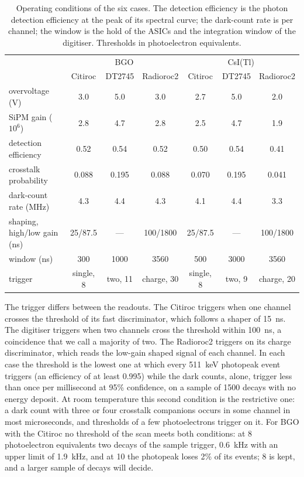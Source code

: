 \documentclass[11pt]{article}
\newcommand{\csitl}{CsI(Tl)\xspace}
\begin{document}
\begin{table}[htbp]
\centering
\small
\caption{Operating conditions of the six cases. The detection efficiency
is the photon detection efficiency at the peak of its spectral curve; the
dark-count rate is per channel; the window is the hold of the ASICs and
the integration window of the digitiser. Thresholds in photoelectron
equivalents.}
\label{tab:conditions}
\begin{tabular}{l ccc ccc}
\toprule
 & \multicolumn{3}{c}{BGO} & \multicolumn{3}{c}{\csitl} \\
 & Citiroc & DT2745 & Radioroc2 & Citiroc & DT2745 & Radioroc2 \\
\midrule
overvoltage (V) & 3.0 & 5.0 & 3.0 & 2.7 & 5.0 & 2.0 \\
SiPM gain ($10^6$) & 2.8 & 4.7 & 2.8 & 2.5 & 4.7 & 1.9 \\
detection efficiency & 0.52 & 0.54 & 0.52 & 0.50 & 0.54 & 0.41 \\
crosstalk probability & 0.088 & 0.195 & 0.088 & 0.070 & 0.195 & 0.041 \\
dark-count rate (MHz) & 4.3 & 4.4 & 4.3 & 4.1 & 4.4 & 3.3 \\
shaping, high/low gain (ns) & 25/87.5 & --- & 100/1800 & 25/87.5 & --- & 100/1800 \\
window (ns) & 300 & 1000 & 3560 & 500 & 3000 & 3560 \\
trigger & single, 8 & two, 11 & charge, 30 & single, 8 & two, 9 & charge, 20 \\
\bottomrule
\end{tabular}
\end{table}

The trigger differs between the readouts. The Citiroc triggers when one
channel crosses the threshold of its fast discriminator, which follows a
shaper of 15~ns. The digitiser triggers when two channels cross the
threshold within 100~ns, a coincidence that we call a majority of two.
The Radioroc2 triggers on its charge discriminator, which reads the
low-gain shaped signal of each channel. In each case the threshold is the
lowest one at which every 511~keV photopeak event triggers (an efficiency
of at least 0.995) while the dark counts, alone, trigger less than once per
millisecond at 95\% confidence, on a sample of 1500 decays with no energy
deposit. At room temperature this second condition is the restrictive
one: a dark count with three or four crosstalk companions occurs in some
channel in most microseconds, and thresholds of a few photoelectrons
trigger on it. For BGO with the Citiroc no threshold of the scan meets
both conditions: at 8 photoelectron equivalents two decays of the sample
trigger, 0.6~kHz with an upper limit of 1.9~kHz, and at 10 the photopeak
loses 2\% of its events; 8 is kept, and a larger sample of decays will
decide.
\end{document}

